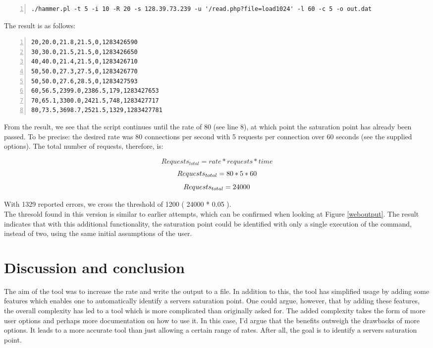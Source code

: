 \begin{Verbatim}[commandchars=\\\{\},numbers=left,label=hammer.pl execution example with new option]
./hammer.pl -t 5 -i 10 -R 20 -s 128.39.73.239 -u '/read.php?file=load1024' -l 60 -c 5 -o out.dat
\end{Verbatim}

The result is as follows: 
\begin{Verbatim}[commandchars=\\\{\},numbers=left,label=hammer.pl execution example with new option]
20,20.0,21.8,21.5,0,1283426590
30,30.0,21.5,21.5,0,1283426650
40,40.0,21.4,21.5,0,1283426710
50,50.0,27.3,27.5,0,1283426770
50,50.0,27.6,28.5,0,1283427593
60,56.5,2399.0,2386.5,179,1283427653
70,65.1,3300.0,2421.5,748,1283427717
80,73.5,3698.7,2521.5,1329,1283427781
\end{Verbatim}


From the result, we see that the script continues until the rate of 80 (see line 8), at which point the saturation point has already been passed. To be precise: the desired rate was 80 connections per second with 5 requests per connection over 60 seconds (see the supplied options). The total number of requests, therefore, is: 

\[
	Requests_{total} = rate * requests * time
\] 
\[
	Requests_{total} = 80 * 5 * 60\\
\]
\[
	Requests_{total} = 24000\\
\]

With 1329 reported errors, we cross the threshold of 1200 ( 24000 * 0.05 ).\\


The thresold found in this version is similar to earlier attempts, which can be confirmed when looking at Figure \ref{weboutput}. The result indicates that with this additional functionality, the saturation point could be identified with only a single execution of the command, instead of two, using the same initial assumptions of the user.
 
\section{Discussion and conclusion}

The aim of the tool was to increase the rate and write the output to a file. In addition to this, the tool has simplified usage by adding some features which enables one to automatically identify a servers saturation point. One could argue, however, that by adding these features, the overall complexity has led to a tool which is more complicated than originally asked for. The added complexity takes the form of more user options and perhaps more documentation on how to use it. In this case, I'd argue that the benefits outweigh the drawbacks of more options. It leads to a more accurate tool than just allowing a certain range of rates. After all, the goal is to identify a servers saturation point.\\

